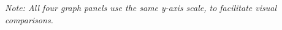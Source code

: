\documentclass{article}
\begin{document}
\emph{Note: All four graph panels use the same y-axis scale, to facilitate visual comparisons.}

\begin{comment}
\begin{figure}[h!]
\centering
\texttt{[image: data/2025-06-15-09-31-29--sigaligned-blocked\_joint.pdf]}
\caption*{
  With one path blocked, no interference is expected, and coincidence visibility is near zero ($V_{\text{c,blocked}}=0.1887 \pm 1.6822$). The idler singles visibility is also low ($V_{\text{i,blocked}}=0.0047 \pm 0.0005$).
}
\end{figure}
\end{comment}
\end{document}
